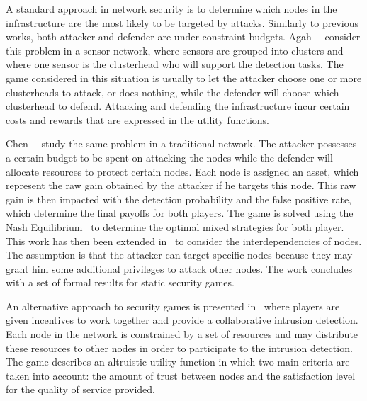  A standard approach in network security is to determine which nodes in the infrastructure are the most likely to be targeted by attacks. 
 Similarly to previous works, both attacker and defender are under constraint budgets.
 Agah~\etal~\cite{agah2004} consider this problem in a sensor network, where sensors are grouped into clusters and where one sensor is the clusterhead who will support the detection tasks.
 The game considered in this situation is usually to let the attacker choose one or more clusterheads to attack, or does nothing, while the defender will choose which clusterhead to defend.
 Attacking and defending the infrastructure incur certain costs and rewards that are expressed in the utility functions.
 
 Chen~\etal~\cite{Chen2009} study the same problem in a traditional network. The attacker possesses a certain budget to be spent on attacking the nodes while the defender will allocate resources to protect certain nodes.
 Each node is assigned an asset, which represent the raw gain obtained by the attacker if he targets this node.
 This raw gain is then impacted with the detection probability and the false positive rate, which determine the final payoffs for both players.
 The game is solved using the Nash Equilibrium~\cite{nasheq} to determine the optimal mixed strategies for both player.
 This work has then been extended in~\cite{interdep-ismail2017} to consider the interdependencies of nodes.
 The assumption is that the attacker can target specific nodes because they may grant him some additional privileges to attack other nodes.
 The work concludes with a set of formal results for static security games.
 
 An alternative approach to security games is presented in~\cite{Zhu2009b} where players are given incentives to work together and provide a collaborative intrusion detection.
 Each node in the network is constrained by a set of resources and may distribute these resources to other nodes in order to participate to the intrusion detection.
 The game describes an altruistic utility function in which two main criteria are taken into account: the amount of trust between nodes and the satisfaction level for the quality of service provided.

